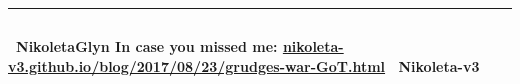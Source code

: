 \documentclass[usenames,dvipsnames,t]{beamer}
\begin{document}
\vspace{1cm}

\hrule height 5pt
\begin{columns}
    \begin{column}{.8\linewidth}
        \hspace{1cm}
     \textbf{ \faTwitter \ NikoletaGlyn \hspace{2cm} In case you missed me: \url{nikoleta-v3.github.io/blog/2017/08/23/grudges-war-GoT.html} \hspace{2cm} \faGithub \ Nikoleta-v3}
     \end{column}
\end{columns}
\end{document}
